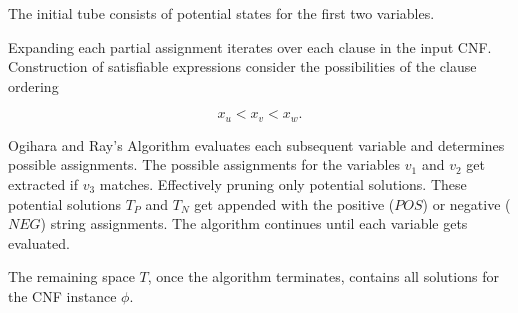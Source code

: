 The initial tube consists of potential states for the first two variables.


Expanding each partial assignment iterates over each clause in the input CNF.  Construction of satisfiable expressions consider the possibilities of the clause ordering

\[
x_u < x_v < x_w.
\]

{\sc Ogihara and Ray's Algorithm} evaluates each subsequent variable and determines possible assignments.  The possible assignments for the variables $v_1$ and $v_2$ get extracted if $v_3$ matches.  Effectively pruning only potential solutions.  These potential solutions $T_P$ and $T_N$ get appended with the positive ($POS$) or negative ($NEG$) string assignments.  The algorithm continues until each variable gets evaluated.  

The remaining space $T$, once the algorithm terminates, contains all solutions for the CNF instance $\phi$.





%
%
%
%
%
%
%
%
%
		
